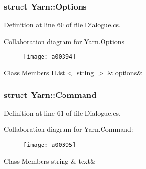 \subsubsection{struct Yarn\-:\-:Options}


Definition at line 60 of file Dialogue.\-cs.



Collaboration diagram for Yarn.\-Options\-:
\nopagebreak
\begin{figure}[H]
\begin{center}
\leavevmode
\texttt{[image: a00394]}
\end{center}
\end{figure}
\begin{DoxyFields}{Class Members}
\hypertarget{a00053_ae8c616d923ceeeed192a9436c55d9917}{I\-List$<$ string $>$}\label{a00053_ae8c616d923ceeeed192a9436c55d9917}
&
options&
\\
\hline

\end{DoxyFields}
\label{a00376}
\hypertarget{a00053_a00376}{}
\subsubsection{struct Yarn\-:\-:Command}


Definition at line 61 of file Dialogue.\-cs.



Collaboration diagram for Yarn.\-Command\-:
\nopagebreak
\begin{figure}[H]
\begin{center}
\leavevmode
\texttt{[image: a00395]}
\end{center}
\end{figure}
\begin{DoxyFields}{Class Members}
\hypertarget{a00053_a8564e5104566e145f5d917ec846444d9}{string}\label{a00053_a8564e5104566e145f5d917ec846444d9}
&
text&
\\
\hline

\end{DoxyFields}
